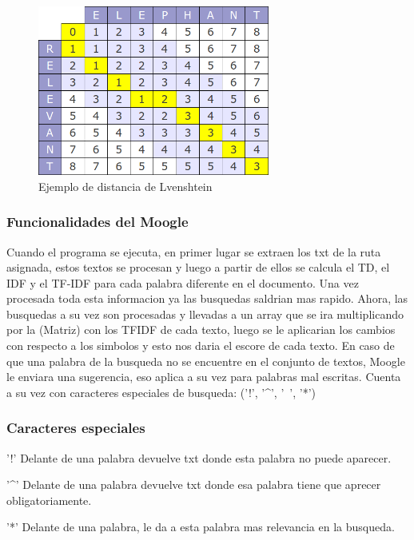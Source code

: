 \documentclass{beamer}
\begin{document}
\begin{figure}[h]
    \centering
	\includegraphics[width=0.68\textwidth]{imagenes/diagrama.png}
    \caption{Ejemplo de distancia de Lvenshtein}
    \label{img:3}
\end{figure}







\begin{frame}
	\frametitle{Funcionalidades del Moogle}
	\begin{minipage}{10 cm}
		Cuando el programa se ejecuta, en primer lugar se extraen los txt de la ruta asignada, estos textos se procesan y luego a partir de ellos se calcula el TD, el IDF y el TF-IDF para cada palabra diferente en el documento. Una vez procesada toda esta informacion ya las busquedas saldrian mas rapido. Ahora, las busquedas a su vez son procesadas y llevadas a un array que se ira multiplicando por la (Matriz) con los TFIDF de cada texto, luego se le aplicarian los cambios con respecto a los simbolos y esto nos daria el escore de cada texto. En caso de que una palabra de la busqueda no se encuentre en el conjunto de textos, Moogle le enviara una sugerencia, eso aplica a su vez para palabras mal escritas. 
Cuenta a su vez con caracteres especiales de busqueda: ('!', '\^{}', '~', '*')
	\end{minipage}
\end{frame}





\begin{frame}
	\frametitle{Caracteres especiales}
	\begin{minipage}{10cm}
	\begin{alertblock}{'!'}
		 Delante de una palabra devuelve txt donde esta palabra no puede aparecer.
	\end{alertblock}
	\begin{alertblock}{'\^{}'}
		Delante de una palabra devuelve txt donde esa palabra tiene que aprecer obligatoriamente.
	\end{alertblock}

      \begin{alertblock}{'*'}
            Delante de una palabra, le da a esta palabra mas relevancia en la busqueda. 
      \end{alertblock} 
	\end{minipage}
\end{frame}
\end{document}
